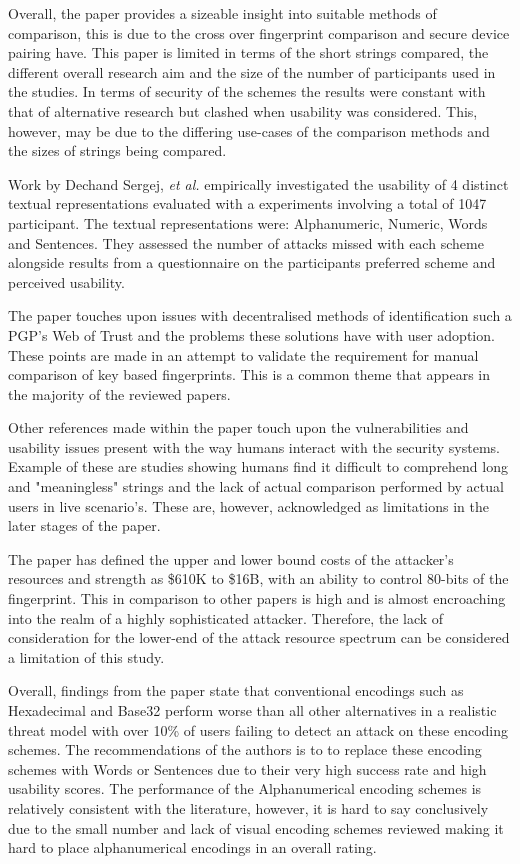 Overall, the paper provides a sizeable insight into suitable methods of comparison, this is due to the cross over fingerprint comparison and secure device pairing have. This paper is limited in terms of the short strings compared, the different overall research aim and the size of the number of participants used in the studies. In terms of security of the schemes the results were constant with that of alternative research but clashed when usability was considered. This, however, may be due to the differing use-cases of the comparison methods and the sizes of strings being compared.

Work by Dechand Sergej, \textit{et al.}\cite{dechand2016empirical} empirically investigated the usability of 4 distinct textual representations evaluated with a experiments involving a total of 1047 participant. The textual representations were: Alphanumeric, Numeric, Words and Sentences. They assessed the number of attacks missed with each scheme alongside results from a questionnaire on the participants preferred scheme and perceived usability.

The paper touches upon issues with decentralised methods of identification such a PGP's Web of Trust and the problems these solutions have with user adoption. These points are made in an attempt to validate the requirement for manual comparison of key based fingerprints. This is a common theme that appears in the majority of the reviewed papers.

Other references made within the paper touch upon the vulnerabilities and usability issues present with the way humans interact with the security systems. Example of these are studies showing humans find it difficult to comprehend long and "meaningless" strings and the lack of actual comparison performed by actual users in live scenario's. These are, however, acknowledged as limitations in the later stages of the paper.

The paper has defined the upper and lower bound costs of the attacker's resources and strength as \$610K to \$16B, with an ability to control 80-bits of the fingerprint. This in comparison to other papers is high and is almost encroaching into the realm of a highly sophisticated attacker. Therefore, the lack of consideration for the lower-end of the attack resource spectrum can be considered a limitation of this study.

Overall, findings from the paper state that conventional encodings such as Hexadecimal and Base32 perform worse than all other alternatives in a realistic threat model with over 10\% of users failing to detect an attack on these encoding schemes. The recommendations of the authors is to to replace these encoding schemes with Words or Sentences due to their very high success rate and high usability scores. The performance of the Alphanumerical encoding schemes is relatively consistent with the literature, however, it is hard to say conclusively due to the small number and lack of visual encoding schemes reviewed making it hard to place alphanumerical encodings in an overall rating.